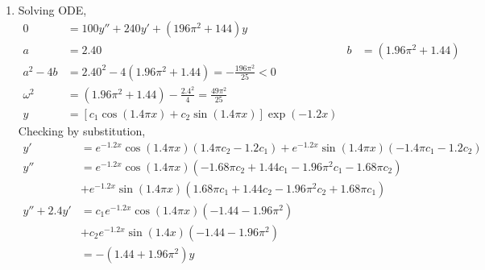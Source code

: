 \begin{enumerate}
    \item Solving ODE,
          \begin{align}
              0          & = 100y'' + 240y' + (196 \pi ^{2} + 144)y                                                            \\
              a          & = 2.40                                                               & b & = (1.96 \pi ^{2} + 1.44) \\
              a^{2} - 4b & = 2.40^{2} - 4(1.96\pi ^{2} + 1.44) = - \frac{196 \pi^{2}}{25} < 0                                  \\
              \omega^{2} & = (1.96 \pi ^{2} + 1.44) - \frac{2.4^{2}}{4} = \frac{49 \pi^{2}}{25}                                \\
              y          & = [c_{1}\cos(1.4\pi x) + c_{2}\sin(1.4\pi x)] \exp(-1.2x)
          \end{align}
          Checking by substitution,
          \begin{align}
              y'          & = e^{-1.2x}\cos(1.4\pi x) (1.4\pi c_{2} - 1.2c_{1}) + e^{-1.2x}\sin(1.4\pi x)(-1.4\pi c_{1} - 1.2c_{2}) \\
              y''         & = e^{-1.2x}\cos(1.4\pi x)(-1.68\pi c_{2} + 1.44c_{1} - 1.96\pi^{2} c_{1} - 1.68\pi c_{2})               \\
                          & + e^{-1.2x}\sin(1.4\pi x)(1.68\pi c_{1} + 1.44c_{2} - 1.96\pi^{2} c_{2} + 1.68 \pi c_{1})               \\
              y'' + 2.4y' & = c_{1}e^{-1.2x}\cos(1.4\pi x)(-1.44 - 1.96\pi ^{2})                                                    \\
                          & + c_{2}e^{-1.2x}\sin(1.4x)(-1.44 - 1.96\pi ^{2})                                                        \\
                          & = -(1.44 + 1.96\pi ^{2})y
          \end{align}


\end{enumerate}
